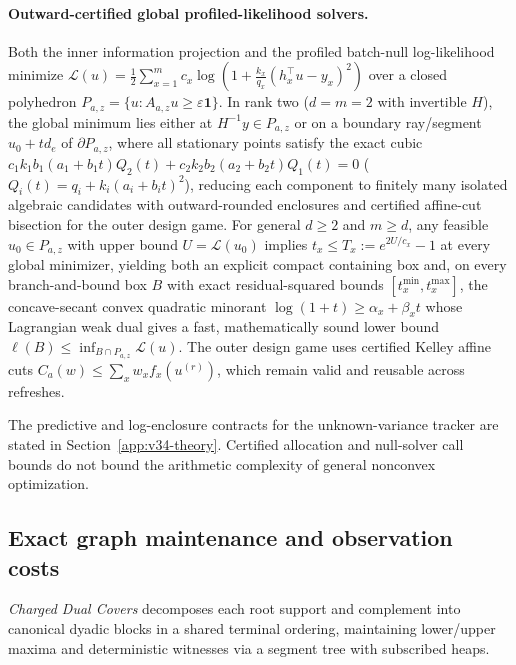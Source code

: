 \documentclass{article}
\theoremstyle{plain}
\theoremstyle{definition}
\begin{document}
\paragraph{Outward-certified global profiled-likelihood solvers.}
Both the inner information projection and the profiled batch-null log-likelihood minimize $\mathcal L(u)=\frac12\sum_{x=1}^m c_x\log(1+\frac{k_x}{q_x}(h_x^\top u-y_x)^2)$ over a closed polyhedron $P_{a,z}=\{u:A_{a,z}u\ge\varepsilon\mathbf 1\}$. In rank two ($d=m=2$ with invertible $H$), the global minimum lies either at $H^{-1}y\in P_{a,z}$ or on a boundary ray/segment $u_0+td_e$ of $\partial P_{a,z}$, where all stationary points satisfy the exact cubic $c_1k_1b_1(a_1+b_1t)Q_2(t)+c_2k_2b_2(a_2+b_2t)Q_1(t)=0$ ($Q_i(t)=q_i+k_i(a_i+b_it)^2$), reducing each component to finitely many isolated algebraic candidates with outward-rounded enclosures and certified affine-cut bisection for the outer design game. For general $d\ge 2$ and $m\ge d$, any feasible $u_0\in P_{a,z}$ with upper bound $U=\mathcal L(u_0)$ implies $t_x\le T_x:=e^{2U/c_x}-1$ at every global minimizer, yielding both an explicit compact containing box and, on every branch-and-bound box $B$ with exact residual-squared bounds $[t_x^{\min},t_x^{\max}]$, the concave-secant convex quadratic minorant $\log(1+t)\ge\alpha_x+\beta_x t$ whose Lagrangian weak dual gives a fast, mathematically sound lower bound $\ell(B)\le\inf_{B\cap P_{a,z}}\mathcal L(u)$. The outer design game uses certified Kelley affine cuts $C_a(w)\le\sum_x w_x f_x(u^{(r)})$, which remain valid and reusable across refreshes.

The predictive and log-enclosure contracts for the unknown-variance tracker are stated in Section~\ref{app:v34-theory}. Certified allocation and null-solver call bounds do not bound the arithmetic complexity of general nonconvex optimization.

\subsection{Exact graph maintenance and observation costs}
\label{sec:computational}\label{sec:oracle-extensions}\label{sec:dual-cover}
\label{sec:selective-volume}\label{sec:puct-extensions}\label{sec:core-theory}
\label{subsec:common-core}\label{sec:strong-compiler}\label{sec:frontier-theory}

\emph{Charged Dual Covers} decomposes each root support and complement into canonical dyadic blocks in a shared terminal ordering, maintaining lower/upper maxima and deterministic witnesses via a segment tree with subscribed heaps.
\end{document}

